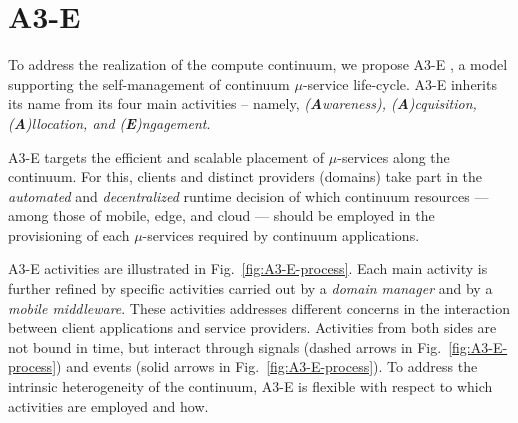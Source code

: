 \section{A3-E}\label{sec:A3-E}


To address the realization of the compute continuum, we propose A3-E
, a model supporting the self-management of continuum $\mu$-service life-cycle. A3-E inherits its name from its four main activities -- namely, \textit{(\textbf{A}wareness), (\textbf{A})cquisition, (\textbf{A})llocation, and (\textbf{E})ngagement}. 

A3-E targets the efficient and scalable placement of $\mu$-services along the continuum. For this, clients and distinct providers (domains) take part in the \textit{automated} and \textit{decentralized} runtime decision of which continuum resources --- among those of mobile, edge, and cloud --- should be employed in the provisioning of each $\mu$-services required by continuum applications.


A3-E activities are illustrated in Fig.~\ref{fig:A3-E-process}. Each main activity 
is further refined by specific activities carried out by a \textit{domain manager} and by a \textit{mobile middleware}. These activities addresses different concerns in the interaction between client applications and service providers. Activities from both sides are not bound in time, but interact through signals (dashed arrows in Fig.~\ref{fig:A3-E-process}) and events (solid arrows in Fig.~\ref{fig:A3-E-process}). To address the intrinsic heterogeneity of the continuum, A3-E is flexible with respect to which activities are employed and how.


